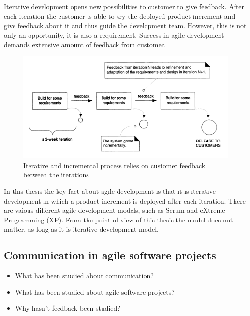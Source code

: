\documentclass[english,12pt,a4paper,pdftex]{article}
\begin{document}
Iterative development opens new possibilities to customer to give feedback. After each iteration the customer is able to try the deployed product increment and give feedback about it and thus guide the development team. However, this is not only an opportunity, it is also a requirement. Success in agile development demands extensive amount of feedback from customer.

\begin{figure}[htb]
\begin{center}
\includegraphics[width=1.0\textwidth]{iterative_and_incremental.png}
\end{center}
\caption{Iterative and incremental process relies on customer feedback between the iterations \citep{larman2004}}
\label{fig:iterative_and_incremental}
\end{figure}

In this thesis the key fact about agile development is that it is iterative development in which a product increment is deployed after each iteration. There are vaious different agile development models, such as Scrum and eXtreme Programming (XP). From the point-of-view of this thesis the model does not matter, as long as it is iterative development model.

\subsection{Communication in agile software projects}

\begin{itemize}
\item What has been studied about communication?
\item What has been studied about agile software projects?
\item Why hasn't feedback been studied?
\end{itemize}
\end{document}
